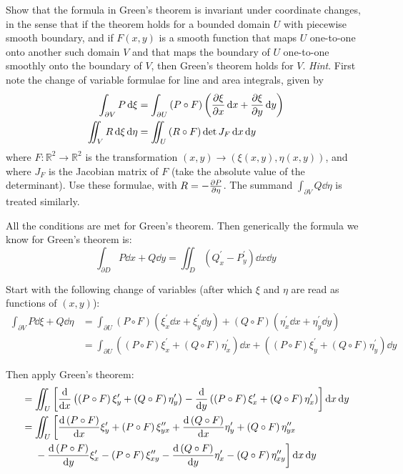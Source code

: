 \documentclass[11pt]{article}
\newcommand{\br}[1]{\left(#1\right)}
\newcommand{\sbr}[1]{\left[#1\right]}
\newcommand{\dprime}{\prime\prime}
\begin{document}
Show that the formula in Green's theorem is invariant under coordinate changes, in the sense that if the theorem holds for a bounded domain $U$ with piecewise smooth boundary, and if $F(x,y)$ is a smooth function that maps $U$ one-to-one onto another such domain $V$ and that maps the boundary of $U$ one-to-one smoothly onto the boundary of $V$, then Green's theorem holds for $V$. \textit{Hint}. First note the change of variable formulae for line and area integrals, given by
\begin{align*}
    \int_{\partial V}P\dd{\xi} &= \int_{\partial U}\br{P\circ F}\br{\pdv{\xi}{x}\dd{x} + \pdv{\xi}{y}\dd{y}}\\
    \iint_V R\dd{\xi}\dd{\eta} &= \iint_U \br{R\circ F}\det J_F\dd{x}\dd{y}
\end{align*}
where $F:\mathbb{R}^2\to \mathbb{R}^2$ is the transformation $(x,y)\to (\xi(x,y),\eta(x,y))$, and where $J_F$ is the Jacobian matrix of $F$ (take the absolute value of the determinant). Use these formulae, with $R=-\pdv{P}{\eta}$. The summand $\int_{\partial V} Q\dd{\eta}$ is treated similarly.


All the conditions are met for Green's theorem. Then generically the formula we know for Green's theorem is:
$$\int_{\partial D} P\dd{x} + Q\dd{y} = \iint_D \br{Q^{\prime}_x - P^{\prime}_y}\dd{x}\dd{y}$$

Start with the following change of variables (after which $\xi$ and $\eta$ are read as functions of $(x,y)$):
\begin{align*}
    \int_{\partial V} P\dd{\xi} + Q\dd{\eta} &= \int_{\partial U} \br{P\circ F}\br{\xi^{\prime}_x\dd{x} + \xi^{\prime}_y\dd{y}} + \br{Q\circ F}\br{\eta^{\prime}_x\dd{x} + \eta^{\prime}_y\dd{y}} \\
    &= \int_{\partial U}\br{\br{P\circ F}\xi^{\prime}_x + \br{Q\circ F}\eta^{\prime}_x}\dd{x} + \br{\br{P\circ F}\xi^{\prime}_y + \br{Q\circ F}\eta^{\prime}_y}\dd{y}
\end{align*}

Then apply Green's theorem:
\begin{align*}
    &= \iint_U\sbr{ \dv{x}\br{\br{P\circ F}\xi^{\prime}_y + \br{Q\circ F}\eta^{\prime}_y} - \dv{y}\br{\br{P\circ F}\xi^{\prime}_x + \br{Q\circ F}\eta^{\prime}_x} }\dd{x}\dd{y}\\
    &= \iint_U\bigg[\dv{\br{P\circ F}}{x}\xi^{\prime}_y + \br{P\circ F}\xi^{\dprime}_{yx} + \dv{\br{Q\circ F}}{x}\eta^{\prime}_y + \br{Q\circ F}\eta^{\dprime}_{yx} \\ &~~~~ - \dv{\br{P\circ F}}{y}\xi^{\prime}_x - \br{P\circ F}\xi^{\dprime}_{xy} - \dv{\br{Q\circ F}}{y}\eta^{\prime}_x - \br{Q\circ F}\eta^{\dprime}_{xy}\bigg]\dd{x}\dd{y}
\end{align*}
\end{document}
